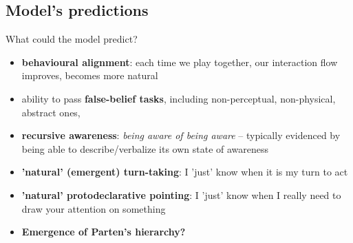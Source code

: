 \documentclass[compress]{beamer}
\begin{document}
\subsection{Model's predictions}
\begin{frame}{What could the model predict?}

    \begin{itemize}

        \item {\bf behavioural alignment}: each time we play together, our
            interaction flow improves, becomes more natural

        \item ability to pass {\bf false-belief tasks}, including
            non-perceptual, non-physical, abstract ones,

        \item {\bf recursive awareness}: \emph{being aware of being aware} -- typically
            evidenced by being able to describe/verbalize its own state of
            awareness 

        \item {\bf 'natural' (\ie emergent) turn-taking}: I 'just' know when it is my
            turn to act

        \item {\bf 'natural' protodeclarative pointing}: I 'just' know when I really
            need to draw your attention on something

        \item {\bf Emergence of Parten's hierarchy?}

    \end{itemize}

\end{frame}

\end{document}
